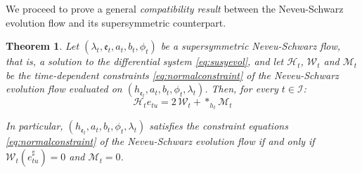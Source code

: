 \documentclass[10pt,reqno,a4paper]{amsart}
\theoremstyle{plain}
\newtheorem{thm}{Theorem}[section]
\theoremstyle{definition}
\theoremstyle{remark}
\theoremstyle{remark}
\def\cH{\mathcal{H}}
\def\cI{\mathcal{I}}
\def\cM{\mathcal{M}}
\def\cW{\mathcal{W}}
\def\cH{\mathcal{H}}
\def\fre{\mathfrak{e}}
\renewcommand{\(}{ (}
\renewcommand{\)}{ )}
\begin{document}
\noindent
We proceed to prove a general \emph{compatibility result} between the Neveu-Schwarz evolution flow and its supersymmetric counterpart.  

\begin{thm}
\label{thm:compatibilityflows}
Let $(\lambda_t,\fre_t, a_t , b_t,\phi_t)$ be a supersymmetric Neveu-Schwarz flow, that is, a solution to the differential system \eqref{eq:susyevol}, and let $\cH_t$, $\cW_t$ and $\cM_t$ be the time-dependent constraints \eqref{eq:normalconstraint} of the Neveu-Schwarz evolution flow evaluated on $(h_{\fre_t}, a_t , b_t,\phi_t,\lambda_t)$. Then, for every $t\in \cI$:
\begin{equation}
\label{eq:constraintidentities0}
\cH_t e_{tu} = 2\, \cW_t  + \ast_{h_t} \cM_t  
\end{equation}

\noindent
In particular, $(h_{\fre_t}, a_t , b_t,\phi_t,\lambda_t)$ satisfies the constraint equations \eqref{eq:normalconstraint} of the Neveu-Schwarz evolution flow if and only if $\cW_t(e^{\sharp}_{tu}) = 0$ and $\cM_t = 0$.
\end{thm}
\end{document}
